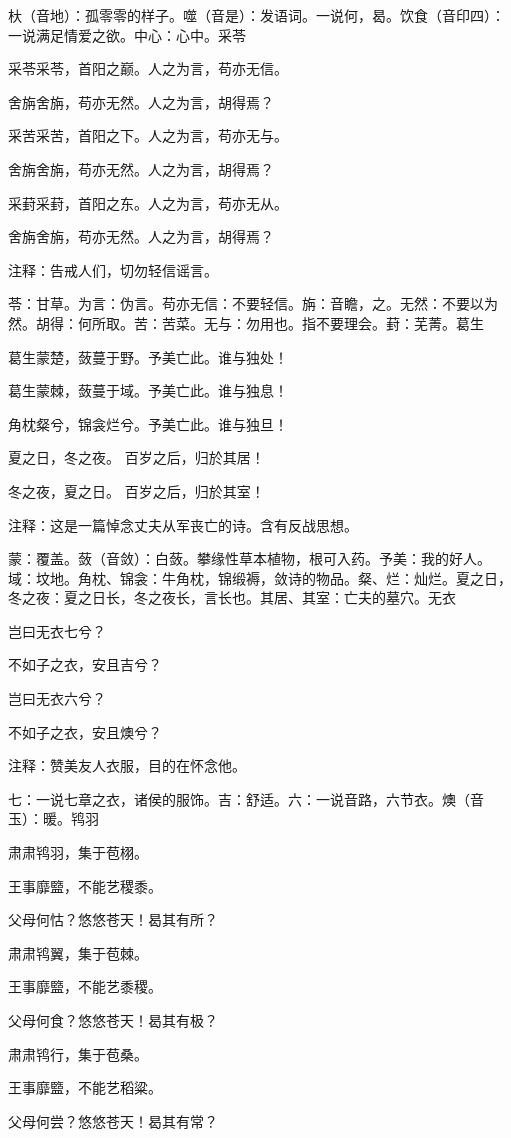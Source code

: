 \documentclass[12pt,UTF8]{ctexbook}
\begin{document}
杕（音地）：孤零零的样子。噬（音是）：发语词。一说何，曷。饮食（音印四）：一说满足情爱之欲。中心：心中。采苓

采苓采苓，首阳之巅。人之为言，苟亦无信。

舍旃舍旃，苟亦无然。人之为言，胡得焉？

采苦采苦，首阳之下。人之为言，苟亦无与。

舍旃舍旃，苟亦无然。人之为言，胡得焉？

采葑采葑，首阳之东。人之为言，苟亦无从。

舍旃舍旃，苟亦无然。人之为言，胡得焉？

注释：告戒人们，切勿轻信谣言。

苓：甘草。为言：伪言。苟亦无信：不要轻信。旃：音瞻，之。无然：不要以为然。胡得：何所取。苦：苦菜。无与：勿用也。指不要理会。葑：芜菁。葛生

葛生蒙楚，蔹蔓于野。予美亡此。谁与独处！

葛生蒙棘，蔹蔓于域。予美亡此。谁与独息！

角枕粲兮，锦衾烂兮。予美亡此。谁与独旦！

夏之日，冬之夜。 百岁之后，归於其居！

冬之夜，夏之日。 百岁之后，归於其室！

注释：这是一篇悼念丈夫从军丧亡的诗。含有反战思想。

蒙：覆盖。蔹（音敛）：白蔹。攀缘性草本植物，根可入药。予美：我的好人。域：坟地。角枕、锦衾：牛角枕，锦缎褥，敛诗的物品。粲、烂：灿烂。夏之日，冬之夜：夏之日长，冬之夜长，言长也。其居、其室：亡夫的墓穴。无衣

岂曰无衣七兮？

不如子之衣，安且吉兮？

岂曰无衣六兮？

不如子之衣，安且燠兮？

注释：赞美友人衣服，目的在怀念他。

七：一说七章之衣，诸侯的服饰。吉：舒适。六：一说音路，六节衣。燠（音玉）：暖。鸨羽

肃肃鸨羽，集于苞栩。

王事靡盬，不能艺稷黍。

父母何怙？悠悠苍天！曷其有所？

肃肃鸨翼，集于苞棘。

王事靡盬，不能艺黍稷。

父母何食？悠悠苍天！曷其有极？

肃肃鸨行，集于苞桑。

王事靡盬，不能艺稻粱。

父母何尝？悠悠苍天！曷其有常？
\end{document}
